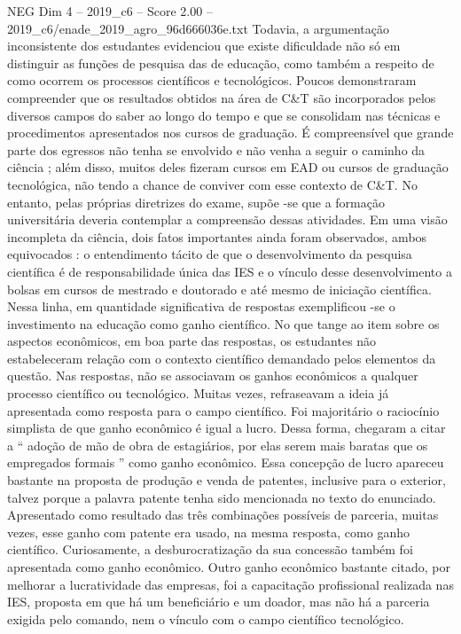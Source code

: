 \begin{textsample}{NEG Dim 4 – 2019\_c6 – Score 2.00 – 2019\_c6/enade\_2019\_agro\_96d666036e.txt}
Todavia, a argumentação inconsistente dos estudantes evidenciou que existe dificuldade não só em distinguir as funções de pesquisa das de educação, como também a respeito de como ocorrem os processos científicos e tecnológicos.
Poucos demonstraram compreender que os resultados obtidos na área de C\&T são incorporados pelos diversos campos do saber ao longo do tempo e que se consolidam nas técnicas e procedimentos apresentados nos cursos de graduação.
É compreensível que grande parte dos egressos não tenha se envolvido e não venha a seguir o caminho da ciência ; além disso, muitos deles fizeram cursos em EAD ou cursos de graduação tecnológica, não tendo a chance de conviver com esse contexto de C\&T.
No entanto, pelas próprias diretrizes do exame, supõe -se que a formação universitária deveria contemplar a compreensão dessas atividades.
Em uma visão incompleta da ciência, dois fatos importantes ainda foram observados, ambos equivocados : o entendimento tácito de que o desenvolvimento da pesquisa científica é de responsabilidade única das IES e o vínculo desse desenvolvimento a bolsas em cursos de mestrado e doutorado e até mesmo de iniciação científica.
Nessa linha, em quantidade significativa de respostas exemplificou -se o investimento na educação como ganho científico.
No que tange ao item sobre os aspectos econômicos, em boa parte das respostas, os estudantes não estabeleceram relação com o contexto científico demandado pelos elementos da questão.
Nas respostas, não se associavam os ganhos econômicos a qualquer processo científico ou tecnológico.
Muitas vezes, refraseavam a ideia já apresentada como resposta para o campo científico.
Foi majoritário o raciocínio simplista de que ganho econômico é igual a lucro.
Dessa forma, chegaram a citar a “ adoção de mão de obra de estagiários, por elas serem mais baratas que os empregados formais ” como ganho econômico.
Essa concepção de lucro apareceu bastante na proposta de produção e venda de patentes, inclusive para o exterior, talvez porque a palavra patente tenha sido mencionada no texto do enunciado.
Apresentado como resultado das três combinações possíveis de parceria, muitas vezes, esse ganho com patente era usado, na mesma resposta, como ganho científico.
Curiosamente, a desburocratização da sua concessão também foi apresentada como ganho econômico.
Outro ganho econômico bastante citado, por melhorar a lucratividade das empresas, foi a capacitação profissional realizada nas IES, proposta em que há um beneficiário e um doador, mas não há a parceria exigida pelo comando, nem o vínculo com o campo científico tecnológico.

\end{textsample}
